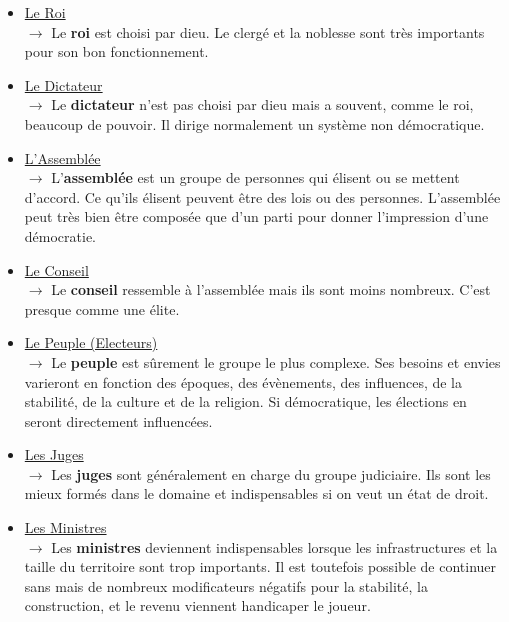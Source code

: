 \documentclass{article}
\begin{document}
                        \begin{itemize}
                            \item \underline{Le Roi}\\
                                $\rightarrow$ Le \textbf{roi} est choisi par dieu. Le clergé et la noblesse sont très importants pour son bon fonctionnement.
                            \item \underline{Le Dictateur}\\
                                $\rightarrow$ Le \textbf{dictateur} n’est pas choisi par dieu mais a souvent, comme le roi, beaucoup de pouvoir. Il dirige normalement un système non démocratique.
                            \item \underline{L'Assemblée }\\
                                $\rightarrow$ L'\textbf{assemblée} est un groupe de personnes qui élisent ou se mettent d’accord. Ce qu’ils élisent peuvent être des lois ou des personnes. L'assemblée peut très bien être composée que d’un parti pour donner l’impression d’une démocratie. 
                            \item \underline{Le Conseil}\\
                                $\rightarrow$ Le \textbf{conseil} ressemble à l’assemblée mais ils sont moins nombreux. C’est presque comme une élite. 
                            \item \underline{Le Peuple (Electeurs) }\\
                                $\rightarrow$ Le \textbf{peuple} est sûrement le groupe le plus complexe. Ses besoins et envies varieront en fonction des époques, des évènements, des influences, de la stabilité, de la culture et de la religion. Si démocratique, les élections en seront directement influencées. 
                            \item \underline{Les Juges }\\
                                $\rightarrow$ Les \textbf{juges} sont généralement en charge du groupe judiciaire. Ils sont les mieux formés dans le domaine et indispensables si on veut un état de droit.
                            \item \underline{Les Ministres }\\
                                $\rightarrow$ Les \textbf{ministres} deviennent indispensables lorsque les infrastructures et la taille du territoire sont trop importants. Il est toutefois possible de continuer sans mais de nombreux modificateurs négatifs pour la stabilité, la construction, et le revenu viennent handicaper le joueur. 

\end{itemize}
\end{document}

